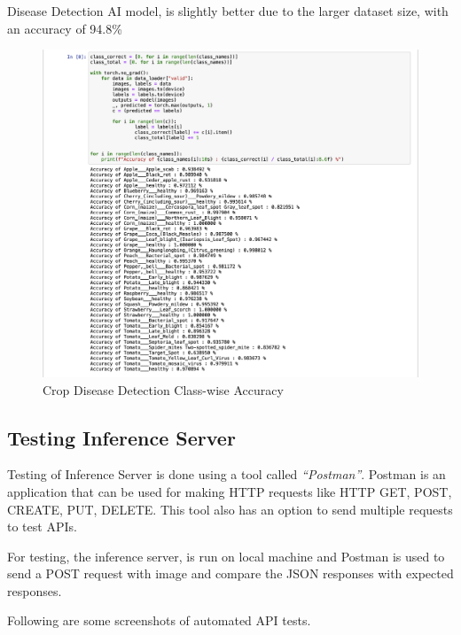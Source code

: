 \documentclass[../Report.tex]{subfiles}
\begin{document}
Disease Detection AI model, is slightly better due to the larger dataset size, with an accuracy of 94.8\%
\begin{figure}[H]
  \centering
  \includegraphics[width=\linewidth]{images/disease_class_acc.png}
  \caption{Crop Disease Detection Class-wise Accuracy}
  \label{fig:test_ai_disease_class_acc}
\end{figure}\par

\subsection{Testing Inference Server}

Testing of Inference Server is done using a tool called \textit{``Postman''}. Postman is an application that can be used for making HTTP 
requests like HTTP GET, POST, CREATE, PUT, DELETE. This tool also has an option to send multiple requests to test APIs.\par

For testing, the inference server, is run on local machine and Postman is used to send a POST request with image and compare the JSON 
responses with expected responses.\par

Following are some screenshots of automated API tests.\par
\end{document}
